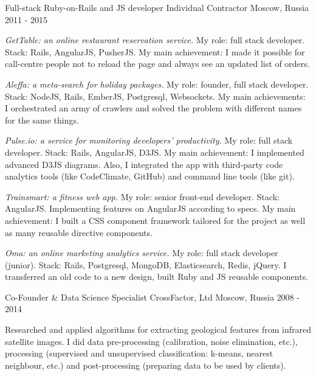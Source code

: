 \begin{cventries}
  \cventry
    {Full-stack Ruby-on-Rails and JS developer} %
    {Individual Contractor} %
    {Moscow, Russia} %
    {2011 - 2015} %
    {
      \begin{cvitems} %
        \item {\textit{GetTable: an online restaurant reservation service.} My role: full stack developer. Stack: Rails, AngularJS, PusherJS. My main achievement: I made it possible for call-centre people not to reload the page and always see an updated list of orders.}
        \item {\textit{Aleffa: a meta-search for holiday packages.} My role: founder, full stack developer. Stack: NodeJS, Rails, EmberJS, Postgresql, Websockets. My main achievements: I orchestrated an army of crawlers and solved the problem with different names for the same things.}
        \item {\textit{Pulse.io: a service for monitoring developers’ productivity.} My role: full stack developer. Stack: Rails, AngularJS, D3JS. My main achievement: I implemented advanced D3JS diagrams. Also, I integrated the app with third-party code analytics tools (like CodeClimate, GitHub) and command line tools (like git).}
        \item {\textit{Trainsmart: a fitness web app.} My role: senior front-end developer. Stack: AngularJS. Implementing features on AngularJS according to specs. My main achievement: I built a CSS component framework tailored for the project as well as many reusable directive components.}
        \item {\textit{Oma: an online marketing analytics service.} My role: full stack developer (junior). Stack: Rails, Postgresql, MongoDB, Elasticsearch, Redis, jQuery. I transferred an old code to a new design, built Ruby and JS reusable components.}
      \end{cvitems}
    }

  \cventry
    {Co-Founder \& Data Science Specialist} %
    {CrossFactor, Ltd} %
    {Moscow, Russia} %
    {2008 - 2014} %
    {
      \begin{cvitems} %
        \item {Researched and applied algorithms for extracting geological features from infrared satellite images. I did data pre-processing (calibration, noise elimination, etc.), processing (supervised and unsupervised classification: k-means, nearest neighbour, etc.) and post-processing (preparing data to be used by clients).}
      \end{cvitems}
    }


\end{cventries}
